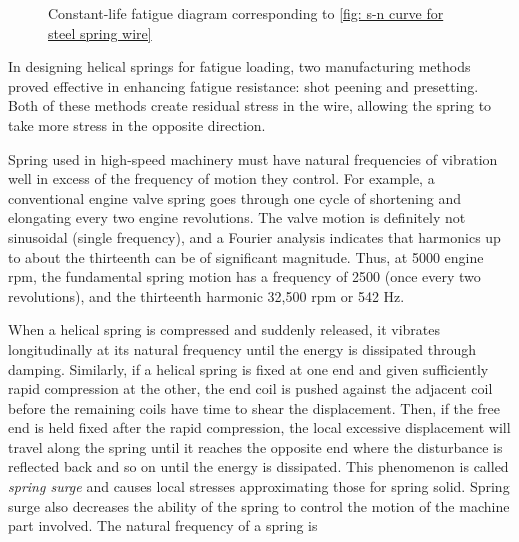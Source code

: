 \documentclass[
10pt,
a4paper,
openany,
svgnames,
]{book}
\begin{document}
\begin{figure}[H]
  \caption{Constant-life fatigue diagram corresponding to \cref{fig: s-n curve for steel spring wire}}
  \label{fig: constant-life diagram for spring}
\end{figure}

In designing helical springs for fatigue loading, two manufacturing methods proved effective in enhancing fatigue resistance: shot peening and presetting. Both of these methods create residual stress in the wire, allowing the spring to take more stress in the opposite direction.

Spring used in high-speed machinery must have natural frequencies of vibration well in excess of the frequency of motion they control. For example, a conventional engine valve spring goes through one cycle of shortening and elongating every two engine revolutions. The valve motion is definitely not sinusoidal (single frequency), and a Fourier analysis indicates that harmonics up to about the thirteenth can be of significant magnitude. Thus, at 5000 engine rpm, the fundamental spring motion has a frequency of 2500 (once every two revolutions), and the thirteenth harmonic 32,500 rpm or 542 Hz.

When a helical spring is compressed and suddenly released, it vibrates longitudinally at its natural frequency until the energy is dissipated through damping. Similarly, if a helical spring is fixed at one end and given sufficiently rapid compression at the other, the end coil is pushed against the adjacent coil before the remaining coils have time to shear the displacement. Then, if the free end is held fixed after the rapid compression, the local excessive displacement will travel along the spring until it reaches the opposite end where the disturbance is reflected back and so on until the energy is dissipated. This phenomenon is called \emph{spring surge} and causes local stresses approximating those for spring solid. Spring surge also decreases the ability of the spring to control the motion of the machine part involved. The natural frequency of a spring is
\end{document}
